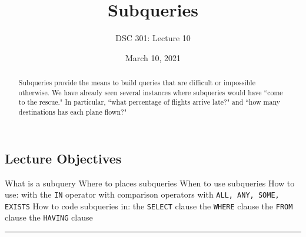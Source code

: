 \documentclass{article}
\newtheorem{definition}{Definition}
\begin{document}
\title{Subqueries}
\author{DSC 301: Lecture 10}
\date{March 10, 2021} %
\maketitle

\begin{abstract}
    Subqueries provide the means to build queries that are difficult or impossible otherwise.  We have already seen several instances where subqueries would have ``come to the rescue."  In particular, ``what percentage of flights arrive late?" and ``how many  destinations has each plane flown?" 
\end{abstract}




\begin{outline}[enumerate]

\end{outline}
\begin{outline}
        
\end{outline}




\subsection*{Lecture Objectives}
\begin{outline}
        \1 What is a subquery
        \1  Where to places subqueries
        \1 When to use subqueries
        \1 How to use:  
                \2 with the \texttt{IN} operator
                \2 with comparison operators
                \2 with \texttt{ALL, ANY, SOME, EXISTS}
        \1 How to code subqueries in:
                \2 the \texttt{SELECT} clause
                \2 the \texttt{WHERE} clause
                \2 the \texttt{FROM} clause        
                \2 the \texttt{HAVING} clause
        

\end{outline}

\hspace{-0.5cm}\rule[-0.101in]{\textwidth}{0.0025in}
% 
% 
\end{document}
